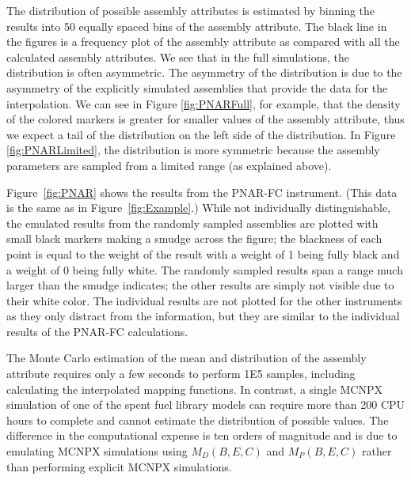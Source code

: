 \documentclass{ansnse}
\begin{document}
The distribution of possible assembly attributes is estimated by binning the results into 50 equally spaced bins of the assembly attribute.  The black line in the figures is a frequency plot of the assembly attribute as compared with all the calculated assembly attributes.  We see that in the full simulations, the distribution is often asymmetric.  The asymmetry of the distribution is due to the asymmetry of the explicitly simulated assemblies that provide the data for the interpolation.  We can see in Figure \ref{fig:PNARFull}, for example, that the density of the colored markers is greater for smaller values of the assembly attribute, thus we expect a tail of the distribution on the left side of the distribution.  In Figure \ref{fig:PNARLimited}, the distribution is more symmetric because the assembly parameters are sampled from a limited range (as explained above).

Figure~\ref{fig:PNAR} shows the results from the PNAR-FC instrument.  (This data is the same as in Figure~\ref{fig:Example}.)  While not individually distinguishable, the emulated results from the randomly sampled assemblies are plotted with small black markers making a smudge across the figure; the blackness of each point is equal to the weight of the result with a weight of 1 being fully black and a weight of 0 being fully white.  The randomly sampled results span a range much larger than the smudge indicates; the other results are simply not visible due to their white color.  The individual results are not plotted for the other instruments as they only distract from the information, but they are similar to the individual results of the PNAR-FC calculations.

The Monte Carlo estimation of the mean and distribution of the assembly attribute requires only a few seconds to perform \num{1E5} samples, including calculating the interpolated mapping functions.  In contrast, a single MCNPX simulation of one of the spent fuel library models can require more than 200 CPU hours to complete and cannot estimate the distribution of possible values.  The difference in the computational expense is ten orders of magnitude and is due to emulating MCNPX simulations using $M_{D}(B,E,C)$ and $M_{P}(B,E,C)$ rather than performing explicit MCNPX simulations.
\end{document}
